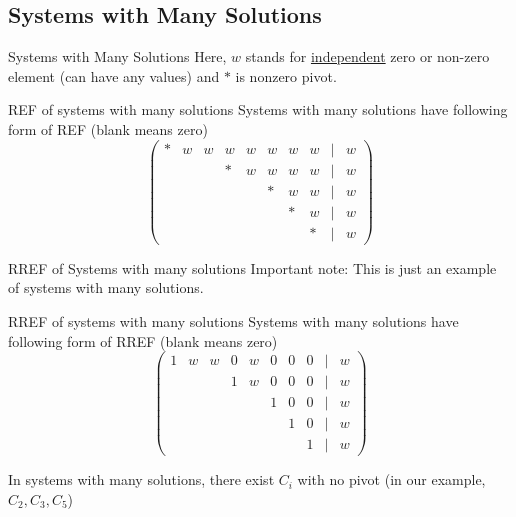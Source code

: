 \documentclass[a4paper,11pt]{article}
\begin{document}
\subsection{Systems with Many Solutions} %
\label{sub:systems_with_many_solutions}
\begin{frame}[t]{Systems with Many Solutions}
	Here, $w$ stands for \uline{independent} zero or non-zero element (can have any values) and $\ast$ is nonzero pivot.
	
	\begin{block}
		{REF of systems with many solutions}
		Systems with many solutions have following form of REF (blank means zero)
		\[
			\tag{REF} \begin{pmatrix} 
				\ast & w& w& w& w& w& w& w& \vert&w\\
				&&&\ast&w& w& w& w& \vert&w\\
				&&&&&\ast&w& w& \vert&w\\
				&&&&&&\ast&w& \vert&w\\
				&&&&&&&\ast&\vert&w
			\end{pmatrix}
		\]
	\end{block}
\end{frame}
\begin{frame}[t]{RREF of Systems with many solutions}
	Important note: This is just an example of systems with many solutions. 
	\begin{block}
		{RREF of systems with many solutions}
		Systems with many solutions have following form of RREF (blank means zero)
		\[
			\tag{RREF} \begin{pmatrix} 
				1 & w& w& 0& w& 0& 0& 0& \vert&w\\
				&&&1&w& 0& 0& 0& \vert&w\\
				&&&&&1&0& 0& \vert&w\\
				&&&&&&1&0& \vert&w\\
				&&&&&&&1&\vert&w
			\end{pmatrix}
		\]
	\end{block}
In systems with many solutions, there exist $C_i$ with no pivot (in our example, $C_2,C_3,C_5$)
\end{frame}
\end{document}
